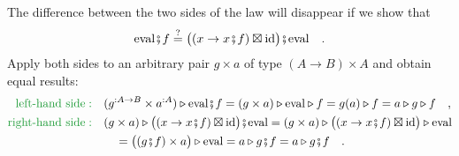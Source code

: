 The difference between the two sides of the law will disappear if
we show that
\[
\text{eval}\bef f\overset{?}{=}\big((x\rightarrow x\bef f)\boxtimes\text{id}\big)\bef\text{eval}\quad.
\]
Apply both sides to an arbitrary pair $g\times a$ of type $\left(A\rightarrow B\right)\times A$
and obtain equal results:
\begin{align*}
{\color{greenunder}\text{left-hand side}:}\quad & (g^{:A\rightarrow B}\times a^{:A})\triangleright\text{eval}\bef f=(g\times a)\triangleright\text{eval}\triangleright f=g(a)\triangleright f=a\triangleright g\triangleright f\quad,\\
{\color{greenunder}\text{right-hand side}:}\quad & (g\times a)\triangleright\big((x\rightarrow x\bef f)\boxtimes\text{id}\big)\bef\text{eval}=(g\times a)\triangleright\big((x\rightarrow x\bef f)\boxtimes\text{id}\big)\triangleright\text{eval}\\
 & \quad=\big((g\bef f)\times a\big)\triangleright\text{eval}=a\triangleright g\bef f=a\triangleright g\bef f\quad.
\end{align*}

